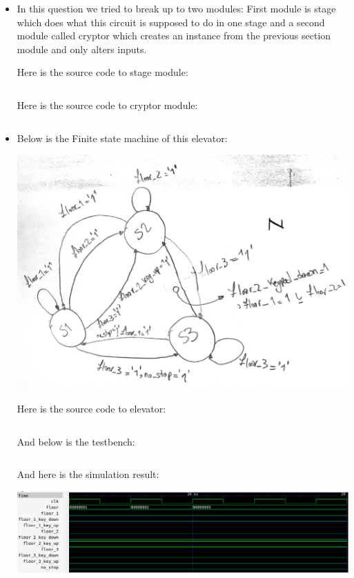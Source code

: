 \documentclass[paper=b4, fontsize=11pt]{scrartcl} %
\numberwithin{equation}{section} %
\numberwithin{figure}{section} %
\numberwithin{table}{section} %
\begin{document}
\begin{itemize}
    \item
        In this question we tried to break up to two modules: First module is
        stage which does what this circuit is supposed to do in one stage and
        a second module called cryptor which creates an instance from the previous
        section module and only alters inputs.

        Here is the source code to stage module:
        \inputminted{vhdl}{q4/src/stage.vhd}

        Here is the source code to cryptor module:
        \inputminted{vhdl}{q4/src/cryptor.vhd}

    \item
        Below is the Finite state machine of this elevator:

        \begin{center}
            \includegraphics[scale=0.6]{q5/fsm.pdf}
        \end{center}

        Here is the source code to elevator:

        \inputminted{vhdl}{q5/src/elevator.vhd}

        And below is the testbench:

        \inputminted{vhdl}{q5/test/elevator_tb.vhd}

        And here is the simulation result:

        \includegraphics[scale=0.7]{q5/elevator.png}


\end{itemize}
\end{document}
